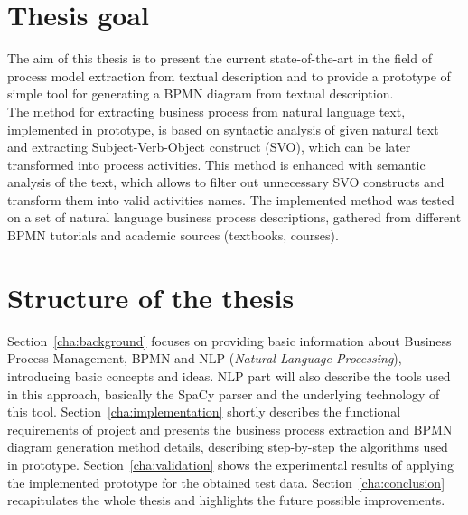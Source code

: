 \section{Thesis goal}
The aim of this thesis is to present the current state-of-the-art in the field of process model extraction from textual description and to provide a prototype of simple tool for generating a BPMN diagram from textual description.\\
The method for extracting business process from natural language text, implemented in prototype, is based on syntactic analysis of given natural text and extracting Subject-Verb-Object construct (SVO), which can be later transformed into process activities. This method is enhanced with semantic analysis of the text, which allows to filter out unnecessary SVO constructs and transform them into valid activities names. The implemented method was tested on a set of natural language business process descriptions, gathered from different BPMN tutorials and academic sources (textbooks, courses).

\section{Structure of the thesis}
Section~\ref{cha:background} focuses on providing basic information about Business Process Management, BPMN and NLP (\emph{Natural Language Processing}), introducing basic concepts and ideas. NLP part will also describe the tools used in this approach, basically the SpaCy parser and the underlying technology of this tool. Section~\ref{cha:implementation} shortly describes the functional requirements of project and presents the business process extraction and BPMN diagram generation method details, describing step-by-step the algorithms used in prototype. Section~\ref{cha:validation} shows the experimental results of applying the implemented prototype for the obtained test data. Section~\ref{cha:conclusion} recapitulates the whole thesis and highlights the future possible improvements.